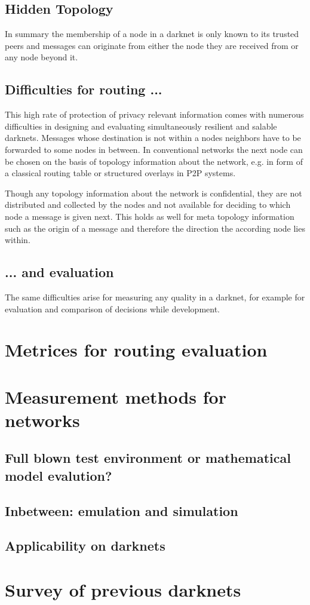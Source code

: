 \subsection{Hidden Topology}

In summary the membership of a node in a darknet is only known to its trusted peers and messages can originate from either the node they are received from or any node beyond it.

\subsection{Difficulties for routing ...}

This high rate of protection of privacy relevant information comes with numerous difficulties in designing and evaluating simultaneously resilient and salable darknets. Messages whose destination is not within a nodes neighbors have to be forwarded to some nodes in between. In conventional networks the next node can be chosen on the basis of topology information about the network, e.g. in form of a classical routing table or structured overlays in P2P systems.

Though any topology information about the network is confidential, they are not distributed and collected by the nodes and not available for deciding to which node a message is given next. This holds as well for meta topology information such as the origin of a message and therefore the direction the according node lies within.


\subsection{... and evaluation}

The same difficulties arise for measuring any quality in a darknet, for example for evaluation and comparison of decisions while development.


\section{Metrices for routing evaluation}



\section{Measurement methods for networks}

\subsection{Full blown test environment or mathematical model evalution?}

\subsection{Inbetween: emulation and simulation}

\subsection{Applicability on darknets}



\section{Survey of previous darknets}


